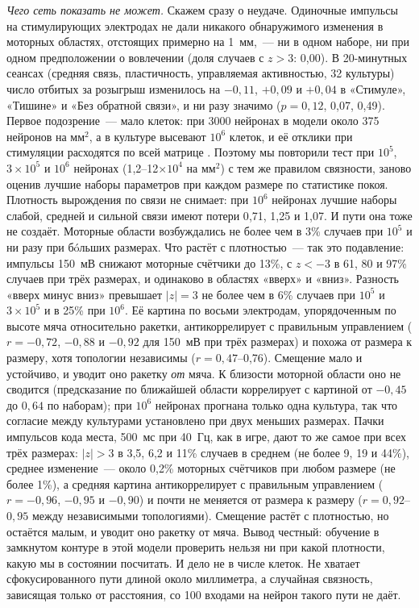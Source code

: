 \documentclass[pre,twocolumn,superscriptaddress,showpacs=false,amsmath,amssymb,nofootinbib]{revtex4-2}
\begin{document}
\emph{Чего сеть показать не может.} Скажем сразу о неудаче. Одиночные импульсы на стимулирующих электродах не дали никакого обнаружимого изменения в моторных областях, отстоящих примерно на 1~мм,~--- ни в одном наборе, ни при одном предположении о вовлечении (доля случаев с $z>3$: 0{,}00). В 20-минутных сеансах (средняя связь, пластичность, управляемая активностью, 32 культуры) число отбитых за розыгрыш изменилось на $-0{,}11$, $+0{,}09$ и $+0{,}04$ в «Стимуле», «Тишине» и «Без обратной связи», и ни разу значимо ($p=0{,}12$, 0{,}07, 0{,}49). Первое подозрение~--- мало клеток: при 3000 нейронах в модели около 375 нейронов на мм$^2$, а в культуре высевают $10^6$ клеток, и её отклики при стимуляции расходятся по всей матрице \cite{Kagan2022}. Поэтому мы повторили тест при $10^5$, $3\times10^5$ и $10^6$ нейронах (1{,}2--12$\times10^4$ на мм$^2$) с тем же правилом связности, заново оценив лучшие наборы параметров при каждом размере по статистике покоя. Плотность вырождения по связи не снимает: при $10^6$ нейронах лучшие наборы слабой, средней и сильной связи имеют потери 0{,}71, 1{,}25 и 1{,}07. И пути она тоже не создаёт. Моторные области возбуждались не более чем в 3\% случаев при $10^5$ и ни разу при бóльших размерах. Что растёт с плотностью~--- так это подавление: импульсы 150~мВ снижают моторные счётчики до 13\%, с $z<-3$ в 61, 80 и 97\% случаев при трёх размерах, и одинаково в областях «вверх» и «вниз». Разность «вверх минус вниз» превышает $|z|=3$ не более чем в 6\% случаев при $10^5$ и $3\times10^5$ и в 25\% при $10^6$. Её картина по восьми электродам, упорядоченным по высоте мяча относительно ракетки, антикоррелирует с правильным управлением ($r=-0{,}72$, $-0{,}88$ и $-0{,}92$ для 150~мВ при трёх размерах) и похожа от размера к размеру, хотя топологии независимы ($r=0{,}47$--0{,}76). Смещение мало и устойчиво, и уводит оно ракетку \emph{от} мяча. К близости моторной области оно не сводится (предсказание по ближайшей области коррелирует с картиной от $-0{,}45$ до $0{,}64$ по наборам); при $10^6$ нейронах прогнана только одна культура, так что согласие между культурами установлено при двух меньших размерах. Пачки импульсов кода места, 500~мс при 40~Гц, как в игре, дают то же самое при всех трёх размерах: $|z|>3$ в 3{,}5, 6{,}2 и 11\% случаев в среднем (не более 9, 19 и 44\%), среднее изменение~--- около 0{,}2\% моторных счётчиков при любом размере (не более 1\%), а средняя картина антикоррелирует с правильным управлением ($r=-0{,}96$, $-0{,}95$ и $-0{,}90$) и почти не меняется от размера к размеру ($r=0{,}92$--$0{,}95$ между независимыми топологиями). Смещение растёт с плотностью, но остаётся малым, и уводит оно ракетку от мяча. Вывод честный: обучение в замкнутом контуре в этой модели проверить нельзя ни при какой плотности, какую мы в состоянии посчитать. И дело не в числе клеток. Не хватает сфокусированного пути длиной около миллиметра, а случайная связность, зависящая только от расстояния, со 100 входами на нейрон такого пути не даёт.
\end{document}
